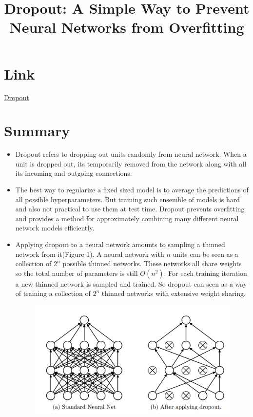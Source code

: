\documentclass{article}
\title{Dropout: A Simple Way to Prevent Neural Networks from Overfitting}
\author{}
\date{}
\begin{document}
\maketitle

\section*{Link}
\href{https://www.cs.toronto.edu/~hinton/absps/JMLRdropout.pdf}{Dropout} 

\section*{Summary}
\begin{itemize}
    \item Dropout refers to dropping out units randomly from neural network. When a unit is dropped out, its temporarily removed from the network along with all its incoming and outgoing connections.
    \item The best way to regularize a fixed sized model is to average the predictions of all possible hyperparameters. But training such ensemble of models is hard and also not practical to use them at test time. Dropout prevents overfitting and provides a method for approximately combining many different neural network models efficiently.
    \item Applying dropout to a neural network amounts to sampling a thinned network from it(Figure 1). A neural network with $n$ units can be seen as a collection of $2^n$ possible thinned networks. These networks all share weights so the total number of parameters is still $O(n^2)$. For each training iteration a new thinned network is sampled and trained. So dropout can seen as a way of training a collection of $2^n$ thinned networks with extensive weight sharing.   
    \begin{figure}[H]
        \centering
        \includegraphics[scale=0.5]{dropout_model.PNG}

\end{figure}
\end{itemize}
\end{document}
